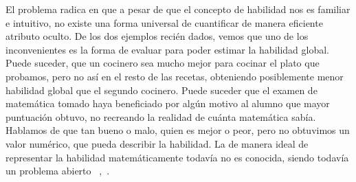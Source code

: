 \documentclass[11pt,twoside, spanish]{report} %
\begin{document}
El problema radica en que a pesar de que el concepto de habilidad nos es familiar e intuitivo, no existe una forma universal de cuantificar de manera eficiente atributo oculto.
De los dos ejemplos reci\'en dados, vemos que uno de los inconvenientes es la forma de evaluar para poder estimar la habilidad global.
Puede suceder, que un cocinero sea mucho mejor para cocinar el plato que probamos, pero no as\'i en el resto de las recetas, obteniendo posiblemente menor habilidad global que el segundo cocinero.
Puede suceder que el examen de matem\'atica tomado haya beneficiado por alg\'un motivo al alumno que mayor puntuaci\'on obtuvo, no recreando la realidad de cu\'anta matem\'atica sab\'ia.
Hablamos de que tan bueno o malo, quien es mejor o peor, pero no obtuvimos un valor num\'erico, que pueda describir la habilidad.
La de manera ideal de representar la habilidad matem\'aticamente todav\'ia no es conocida, siendo todav\'ia un problema abierto ~\cite{elo1961-uscf},~\cite{glikman_gliko_2,Herbrich2007}.
\end{document}
